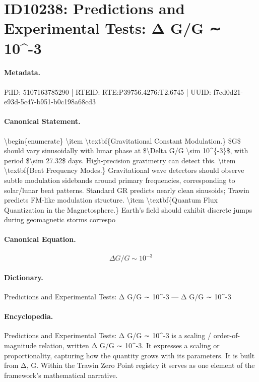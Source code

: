 \section*{ID10238: Predictions and Experimental Tests: Δ G/G ∼ 10\textasciicircum{}-3}
\paragraph{Metadata.}
PiID: 5107163785290 | RTEID: RTE:P39756.4276:T2.6745 | UUID: f7cd0d21-e93d-5c47-b951-b0c198a68cd3

\paragraph{Canonical Statement.}
\textbackslash{}begin\{enumerate\} \textbackslash{}item \textbackslash{}textbf\{Gravitational Constant Modulation.\} \$G\$ should vary sinusoidally with lunar phase at \$\textbackslash{}Delta G/G \textbackslash{}sim 10\textasciicircum{}\{-3\}\$, with period \$\textbackslash{}sim 27.32\$ days. High-precision gravimetry can detect this. \textbackslash{}item \textbackslash{}textbf\{Beat Frequency Modes.\} Gravitational wave detectors should observe subtle modulation sidebands around primary frequencies, corresponding to solar/lunar beat patterns. Standard GR predicts nearly clean sinusoids; Trawin predicts FM-like modulation structure. \textbackslash{}item \textbackslash{}textbf\{Quantum Flux Quantization in the Magnetosphere.\} Earth's field should exhibit discrete jumps during geomagnetic storms correspo

\paragraph{Canonical Equation.}
\[
\Delta G/G \sim 10^{-3}
\]

\paragraph{Dictionary.}
Predictions and Experimental Tests: Δ G/G ∼ 10\textasciicircum{}-3 — Δ G/G ∼ 10\textasciicircum{}-3

\paragraph{Encyclopedia.}
Predictions and Experimental Tests: Δ G/G ∼ 10\textasciicircum{}-3 is a scaling / order-of-magnitude relation, written Δ G/G ∼ 10\textasciicircum{}-3. It expresses a scaling or proportionality, capturing how the quantity grows with its parameters. It is built from Δ, G. Within the Trawin Zero Point registry it serves as one element of the framework's mathematical narrative.
